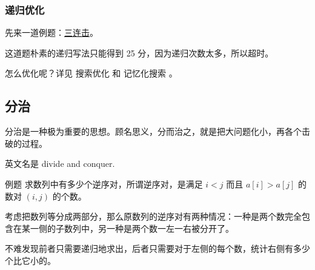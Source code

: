 \subsubsection{递归优化}

先来一道例题：\href{https://www.luogu.org/problemnew/show/P1618}{三连击}。

这道题朴素的递归写法只能得到 25 分，因为递归次数太多，所以超时。

怎么优化呢？详见  搜索优化  和  记忆化搜索 。

\subsection{分治}

分治是一种极为重要的思想。顾名思义，分而治之，就是把大问题化小，再各个击破的过程。

英文名是 divide and conquer.

\begin{NOTE}{例题}{}
求数列中有多少个逆序对，所谓逆序对，是满足 $i < j$ 而且 $a[i] > a[j]$ 的数对 $(i, j)$ 的个数。

\end{NOTE}


考虑把数列等分成两部分，那么原数列的逆序对有两种情况：一种是两个数完全包含在某一侧的子数列中，另一种是两个数一左一右被分开了。

不难发现前者只需要递归地求出，后者只需要对于左侧的每个数，统计右侧有多少个比它小的。
